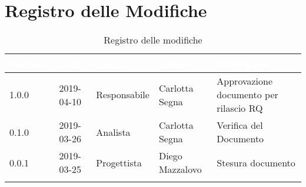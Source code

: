 \newpage

\section*{Registro delle Modifiche}

\begin{center}
\begin{longtable}[c]{|m{}|m{}|m{}|m{}|p{}|}
\hline
\rowcolor{bluelogo}\textbf{\textcolor{white}{Versione}} & \textbf{\textcolor{white}{Data}} & \textbf{\textcolor{white}{Ruolo}} & \textbf{\textcolor{white}{Autore}} & \textbf{\textcolor{white}{Descrizione}}\\
\hline \hline
\endfirsthead
1.0.0 & 2019-04-10 & Responsabile & Carlotta Segna & Approvazione documento per rilascio RQ \\
\hline
\rowcolor{grigio}0.1.0 & 2019-03-26 & Analista & Carlotta Segna & Verifica del Documento \\
\hline
0.0.1 & 2019-03-25 & Progettista & Diego Mazzalovo & Stesura documento \\
\hline
\caption{Registro delle modifiche}
\end{longtable}
\end{center}
